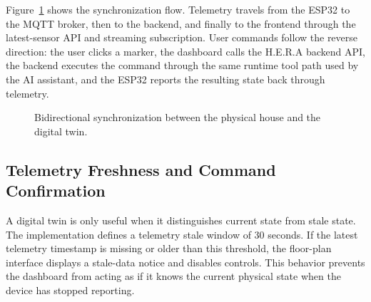 Figure~\ref{fig:digital-twin-dataflow} shows the synchronization flow. Telemetry travels from the ESP32 to the MQTT broker, then to the backend, and finally to the frontend through the latest-sensor API and streaming subscription. User commands follow the reverse direction: the user clicks a marker, the dashboard calls the H.E.R.A backend API, the backend executes the command through the same runtime tool path used by the AI assistant, and the ESP32 reports the resulting state back through telemetry.

\begin{figure}[H]
    \centering
    \caption{Bidirectional synchronization between the physical house and the digital twin.}
    \label{fig:digital-twin-dataflow}
\end{figure}

\subsection{Telemetry Freshness and Command Confirmation}

A digital twin is only useful when it distinguishes current state from stale state. The implementation defines a telemetry stale window of 30 seconds. If the latest telemetry timestamp is missing or older than this threshold, the floor-plan interface displays a stale-data notice and disables controls. This behavior prevents the dashboard from acting as if it knows the current physical state when the device has stopped reporting.


